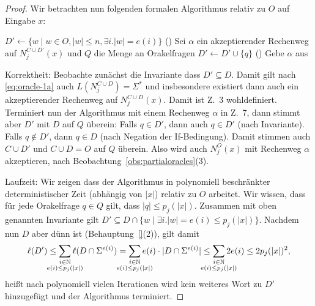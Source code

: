 \begin{proof}
    Wir betrachten nun folgenden formalen Algorithmus relativ zu $O$ auf Eingabe $x$:\\
    \begin{algorithm}[H]
        $D'\gets \{ w\mid w\in O, |w|\leq n, \exists i.|w|=e(i)\}$ 
        \Loop(){}
        {
            Sei $\alpha$ ein akzeptierender Rechenweg auf $N_j^{C\cup D'}(x)$ und $Q$ die Menge an Orakelfragen\;
            {
                $D'\gets D' \cup \{q\}$\;
            }
            \Else(){
                Gebe {$\alpha$} aus\;
            }
        }
    \end{algorithm}

    Korrektheit: Beobachte zunächst die Invariante dass $D'\subseteq D$.
    Damit gilt nach \eqref{eq:oracle-1a} auch $L(N_j^{C\cup D})=\Sigma^*$ und insbesondere existiert dann auch ein akzeptierender Rechenweg auf $N_j^{C\cup D}(x)$. Damit ist Z.~3 wohldefiniert.
    Terminiert nun der Algorithmus mit einem Rechenweg $\alpha$ in Z.~7, 
    dann stimmt aber $D'$ mit $D$ auf $Q$ überein: 
    Falls $q\in D'$, dann auch $q\in D'$ (nach Invariante).
    Falls $q\not\in D'$, dann $q\in D$ (nach Negation der If-Bedingung).
    Damit stimmen auch $C\cup D'$ und $C\cup D=O$ auf $Q$ überein.
    Also wird auch $N_j^O(x)$ mit Rechenweg $\alpha$ akzeptieren, nach Beobachtung~\ref{obs:partialoracles}(3).

    Laufzeit: Wir zeigen dass der Algorithmus in polynomiell beschränkter deterministischer Zeit (abhängig von $|x|$) relativ zu $O$ arbeitet. 
    Wir wissen, dass für jede Orakelfrage $q\in Q$ gilt, dass $|q|\leq p_j(|x|)$.
    Zusammen mit oben genannten Invariante gilt $D'\subseteq D\cap \{w \mid \exists i.|w|=e(i)\leq p_j(|x|)\}$.
    Nachdem nun $D$ aber dünn ist (Behauptung~\ref{}(2)), gilt damit 
\[ \ell(D') \leq \sum_{\mathclap{\substack{i\in\mathbb N\\ e(i)\leq p_j(|x|)}}} \ell(D\cap\Sigma^{e(i)}) = \sum_{\mathclap{\substack{i\in\mathbb N\\ e(i)\leq p_j(|x|)}}} e(i)\cdot |D\cap\Sigma^{e(i)}| \leq \sum_{\mathclap{\substack{i\in\mathbb N\\ e(i)\leq p_j(|x|)}}} 2e(i) \leq 2p_j(|x|)^2, \]
    heißt nach polynomiell vielen Iterationen wird kein weiteres Wort zu $D'$ hinzugefügt und der Algorithmus terminiert.


\end{proof}
